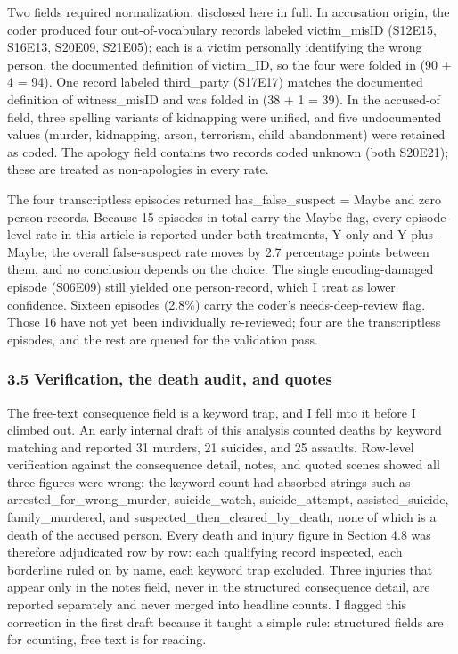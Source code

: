 \documentclass[
]{article}
\newcounter{none} %
\begin{document}
Two fields required normalization, disclosed here in full. In accusation
origin, the coder produced four out-of-vocabulary records labeled
victim\_misID (S12E15, S16E13, S20E09, S21E05); each is a victim
personally identifying the wrong person, the documented definition of
victim\_ID, so the four were folded in (90 + 4 = 94). One record labeled
third\_party (S17E17) matches the documented definition of
witness\_misID and was folded in (38 + 1 = 39). In the accused-of field,
three spelling variants of kidnapping were unified, and five
undocumented values (murder, kidnapping, arson, terrorism, child
abandonment) were retained as coded. The apology field contains two
records coded unknown (both S20E21); these are treated as non-apologies
in every rate.

The four transcriptless episodes returned has\_false\_suspect = Maybe
and zero person-records. Because 15 episodes in total carry the Maybe
flag, every episode-level rate in this article is reported under both
treatments, Y-only and Y-plus-Maybe; the overall false-suspect rate
moves by 2.7 percentage points between them, and no conclusion depends
on the choice. The single encoding-damaged episode (S06E09) still
yielded one person-record, which I treat as lower confidence. Sixteen
episodes (2.8\%) carry the coder's needs-deep-review flag. Those 16 have
not yet been individually re-reviewed; four are the transcriptless
episodes, and the rest are queued for the validation pass.

\subsubsection{3.5 Verification, the death audit, and
quotes}\label{verification-the-death-audit-and-quotes}

The free-text consequence field is a keyword trap, and I fell into it
before I climbed out. An early internal draft of this analysis counted
deaths by keyword matching and reported 31 murders, 21 suicides, and 25
assaults. Row-level verification against the consequence detail, notes,
and quoted scenes showed all three figures were wrong: the keyword count
had absorbed strings such as arrested\_for\_wrong\_murder,
suicide\_watch, suicide\_attempt, assisted\_suicide, family\_murdered,
and suspected\_then\_cleared\_by\_death, none of which is a death of the
accused person. Every death and injury figure in Section 4.8 was
therefore adjudicated row by row: each qualifying record inspected, each
borderline ruled on by name, each keyword trap excluded. Three injuries
that appear only in the notes field, never in the structured consequence
detail, are reported separately and never merged into headline counts. I
flagged this correction in the first draft because it taught a simple
rule: structured fields are for counting, free text is for reading.
\end{document}

